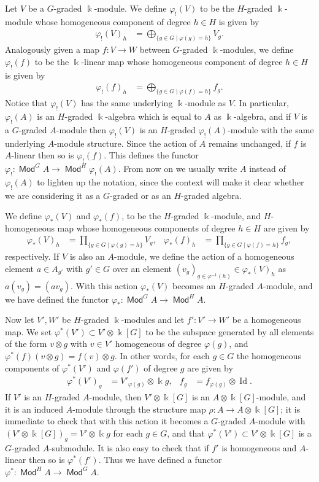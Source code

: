 \documentclass[11pt,fleqn]{article}
\newcommand\ot{\otimes}
\renewcommand\to{\longrightarrow}
\renewcommand\phi{\varphi}
\renewcommand\k{\Bbbk}
\DeclareMathOperator\Mod{\mathsf{Mod}}
\DeclareMathOperator\Id{Id}
\begin{document}
Let $V$ be a $G$-graded $\k$-module. We define $\phi_!(V)$ to be the 
$H$-graded $\k$-module whose homogeneous component of degree $h \in H$ is 
given by
\begin{align*}
\phi_!(V)_h
  &= \bigoplus_{\{g \in G \mid \phi(g) = h\}} V_g.
\end{align*}
Analogously given a map $f: V \to W$ between $G$-graded $\k$-modules, we
define $\phi_!(f)$ to be the $\k$-linear map whose homogeneous component of 
degree $h \in H$ is given by
\begin{align*}
\phi_!(f)_h
  &= \bigoplus_{\{g \in G \mid \phi(f) = h\}} f_g.
\end{align*}
Notice that $\phi_!(V)$ has the same underlying $\k$-module as $V$. In 
particular, $\phi_!(A)$ is an $H$-graded $\k$-algebra which is equal to $A$ as 
$\k$-algebra, and if $V$ is a $G$-graded $A$-module then $\phi_!(V)$ is an 
$H$-graded $\phi_!(A)$-module with the same underlying $A$-module structure. 
Since the action of $A$ remains unchanged, if $f$ is $A$-linear then so is 
$\phi_!(f)$. This defines the functor $\phi_!: \Mod^G A \to \Mod^H \phi_!(A)$. 
From now on we usually write $A$ instead of $\phi_!(A)$ to lighten up the 
notation, since the context will make it clear whether we are considering it 
as a $G$-graded or as an $H$-graded algebra.

We define $\phi_*(V)$ and $\phi_*(f)$, to be the $H$-graded $\k$-module,
and $H$-homogeneous map whose homogeneous components of degree $h \in H$ 
are given by
\begin{align*}
\phi_*(V)_h
  &= \prod_{\{g \in G \mid \phi(g) = h\}} V_g,
&\phi_*(f)_h
  &= \prod_{\{g \in G \mid \phi(f) = h\}} f_g,
\end{align*}
respectively. If $V$ is also an $A$-module, we define the action of a 
homogeneous element $a \in A_{g'}$ with $g' \in G$ over an element 
$(v_g)_{g \in \phi^{-1}(h)} \in \phi_*(V)_h$ as $a(v_g) = (av_g)$. With this 
action $\phi_*(V)$ becomes an $H$-graded $A$-module, and we have defined the 
functor $\phi_*: \Mod^G A \to \Mod^H A$.

Now let $V',W'$ be $H$-graded $\k$-modules and let $f': V' \to W'$ be a 
homogeneous map. We set $\phi^*(V') \subset V' \ot \k[G]$ to be the 
subspace generated by all elements of the form $v \ot g$ with $v \in V'$ 
homogeneous of degree $\phi(g)$, and $\phi^*(f)(v \ot g) = f(v) \ot g$. In 
other words, for each $g \in G$ the homogeneous components of $\phi^*(V')$
and $\phi(f')$ of degree $g$ are given by
\begin{align*}
\phi^*(V')_g 
  &=  V'_{\phi(g)} \ot \k g,
  &f_g
  &= f_{\phi(g)} \ot \Id.
\end{align*}
If $V'$ is an $H$-graded $A$-module, then $V' \ot \k[G]$ is an $A \ot 
\k[G]$-module, and it is an induced $A$-module through the structure map 
$\rho: A \to A \ot \k[G]$; it is immediate to check that with this action it 
becomes a $G$-graded $A$-module with $(V' \ot \k[G])_g = V' \ot \k g$ for 
each $g \in G$, and that $\phi^*(V') \subset V' \ot \k[G]$ is a $G$-graded 
$A$-submodule. It is also easy to check that if $f'$ is homogeneous and 
$A$-linear then so is $\phi^*(f')$. Thus we have defined a functor $\phi^*: 
\Mod^H A \to \Mod^G A$.
\end{document}
